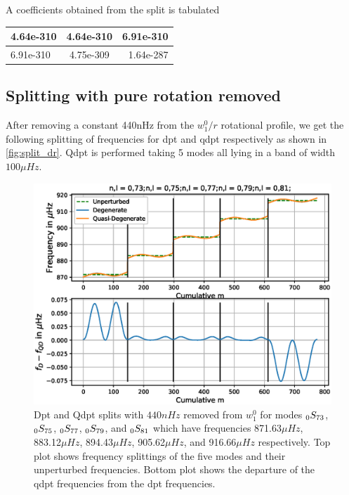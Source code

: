 A coefficients obtained from the split is tabulated

\begin{table}

\begin{tabular}{|l|c|r|}
\hline
4.64e-310 & 4.64e-310 & 6.91e-310 \\ \hline
6.91e-310 & 4.75e-309 & 1.64e-287 \\
\hline
\end{tabular}
\end{table}

\subsection{Splitting with pure rotation removed}
After removing a constant 440nHz from the $w_1^0/r$ rotational profile, we get the following splitting of frequencies for dpt and qdpt respectively as shown in \ref{fig:split_dr}. Qdpt is performed taking 5 modes all lying in a band of width $100\mu Hz$.
\begin{figure}[h!]
\includegraphics[scale=0.8,center]{Chapter4/figs/dr_split_rm}
\caption{Dpt and Qdpt splits with $440 nHz$ removed from $w_1^0$ for modes $_{0}S_{73}$, $_{0}S_{75}$, $_{0}S_{77}$, $_{0}S_{79}$, and $_{0}S_{81}$ which have frequencies 871.63$\mu Hz$, 883.12$\mu Hz$, 894.43$\mu Hz$, 905.62$\mu Hz$, and 916.66$\mu Hz$ respectively. Top plot shows frequency splittings of the five modes and their unperturbed frequencies. Bottom plot shows the departure of the qdpt frequencies from the dpt frequencies.}
\label{fig:split_dr_rm}
\end{figure}

